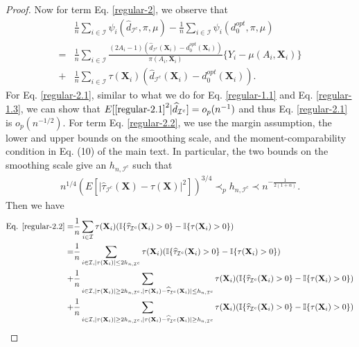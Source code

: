 \documentclass[11pt]{article}
\theoremstyle{referenceplain}
\theoremstyle{referencedefinition}
\theoremstyle{referenceremark}
\begin{document}
\begin{proof}
    Now for term Eq. \eqref{regular-2}, we observe that
    \begin{align}
        &\frac{1}{n}\sum_{i\in\mathcal{I}} \psi_i\left(\widehat{d}_{\mathcal{I}^c}, \pi, \mu\right) - \frac{1}{n}\sum_{i\in\mathcal{I}} \psi_i\left(d_0^{opt}, \pi, \mu\right)\label{regular-2.0}\\
        =&\frac{1}{n}\sum_{i\in\mathcal{I}}\frac{(2A_i-1)(\widehat{d}_{\mathcal{I}^c}(\mathbf{X}_i)-d_0^{opt}(\mathbf{X}_i))}{\pi(A_i,\mathbf{X}_i)}\{Y_i-\mu(A_i,\mathbf{X}_i)\}\label{regular-2.1}\\
         +&\frac{1}{n}\sum_{i\in\mathcal{I}}\tau(\mathbf{X}_i)(\widehat{d}_{\mathcal{I}^c}(\mathbf{X}_i)-d_0^{opt}(\mathbf{X}_i)).\label{regular-2.2}
    \end{align}
    For Eq. \eqref{regular-2.1}, similar to what we do for Eq. \eqref{regular-1.1} and Eq. \eqref{regular-1.3}, we can show that $E[\eqref{regular-2.1}^2|\widehat{d}_{\mathcal{I}^c}]=o_p(n^{-1})$ and thus Eq. \eqref{regular-2.1} is $o_p(n^{-1/2})$. For term Eq. \eqref{regular-2.2}, we use the margin assumption, the lower and upper bounds on the smoothing scale, and the moment-comparability condition in Eq. (10) of the main text. In particular, the two bounds on the smoothing scale give an $h_{n,\mathcal{I}^c}$ such that
    \begin{align}\label{Eq.10 bound}
        n^{1/4}\left(E[|\widehat{\tau}_{\mathcal{I}^c}(\mathbf{X})-\tau(\mathbf{X})|^2]\right)^{3/4}\prec_p h_{n,\mathcal{I}^c}\prec n^{-\frac{1}{2(1+\alpha)}}.
    \end{align}
    Then we have
    \begin{align}
        \text{Eq. }\eqref{regular-2.2}=&\frac{1}{n}\sum_{i\in\mathcal{I}}\tau(\mathbf{X}_i)(\mathbb{I}\{\widehat{\tau}_{\mathcal{I}^c}(\mathbf{X}_i)>0\}-\mathbb{I}\{\tau(\mathbf{X}_i)>0\})\notag\\
        =&\frac{1}{n}\sum_{i\in\mathcal{I},|\tau(\mathbf{X}_i)|\leq 2 h_{n,\mathcal{I}^c}}\tau(\mathbf{X}_i)(\mathbb{I}\{\widehat{\tau}_{\mathcal{I}^c}(\mathbf{X}_i)>0\}-\mathbb{I}\{\tau(\mathbf{X}_i)>0\})\label{regular-2.2.1}\\
        +&\frac{1}{n}\sum_{i\in\mathcal{I},|\tau(\mathbf{X}_i)|\ge 2 h_{n,\mathcal{I}^c}, |\tau(\mathbf{X}_i)-\widehat{\tau}_{\mathcal{I}^c}(\mathbf{X}_i)|\leq h_{n,\mathcal{I}^c}}\tau(\mathbf{X}_i)(\mathbb{I}\{\widehat{\tau}_{\mathcal{I}^c}(\mathbf{X}_i)>0\}-\mathbb{I}\{\tau(\mathbf{X}_i)>0\})\label{regular-2.2.2}\\
        +&\frac{1}{n}\sum_{i\in\mathcal{I},|\tau(\mathbf{X}_i)|\ge 2 h_{n,\mathcal{I}^c}, |\tau(\mathbf{X}_i)-\widehat{\tau}_{\mathcal{I}^c}(\mathbf{X}_i)|\ge h_{n,\mathcal{I}^c}}\tau(\mathbf{X}_i)(\mathbb{I}\{\widehat{\tau}_{\mathcal{I}^c}(\mathbf{X}_i)>0\}-\mathbb{I}\{\tau(\mathbf{X}_i)>0\})\label{regular-2.2.3}

\end{align}
\end{proof}
\end{document}
